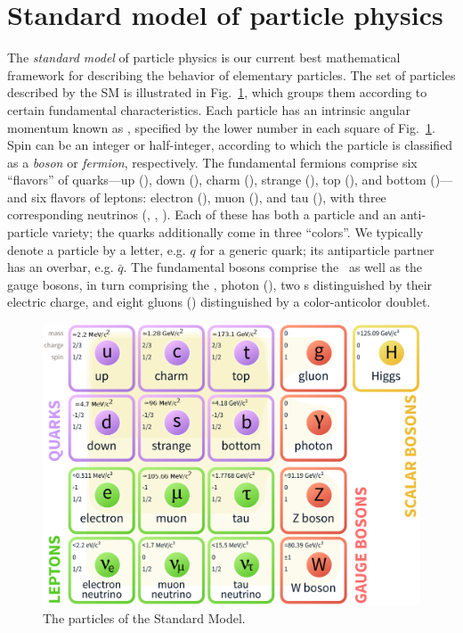 \documentclass[oneside, letterpaper, 12pt, oldfontcommands]{memoir}
\begin{document}
\section{Standard model of particle physics} \label{sec:introduction_standard_model}
The \textit{standard model} of particle physics is our current best mathematical framework for describing the behavior
of elementary particles. The set of particles described by the SM is illustrated in Fig.~\ref{fig:sm_particles}, which
groups them according to certain fundamental characteristics.
Each particle has an intrinsic angular momentum known as , specified by the lower number in each square of Fig.~\ref{fig:sm_particles}.
Spin can be an integer or half-integer, according to which the particle is classified as a \textit{boson} or \textit{fermion}, respectively.
The fundamental fermions comprise six ``flavors'' of quarks---up (\Pu), down (\Pd), charm (\Pc), strange (\Ps), top (\Pt), and bottom (\Pb)---and six flavors of
leptons: electron (\Pe), muon (\Pmu), and tau (\Ptau), with three corresponding neutrinos (\Pne, \Pnmu, \Pntau).
Each of these has both a particle and an anti-particle variety; the quarks additionally come in three ``colors''.
We typically denote a particle by a letter, e.g. $q$ for a generic quark; its antiparticle partner has an overbar, e.g. $\bar{q}$.
The fundamental bosons comprise the \PH\ as well as the gauge bosons, in turn comprising the \PZ, photon (\Pgamma),
two \PW s distinguished by their electric charge, and eight gluons (\Pg) distinguished by a color-anticolor doublet.

\begin{figure}[hbtp]
  \begin{center}
    \includegraphics[width=1.0\textwidth]{Figures/sm_particles.png}
    \caption{
      The particles of the Standard Model.
    }
    \label{fig:sm_particles}
  \end{center}
\end{figure}
\end{document}

